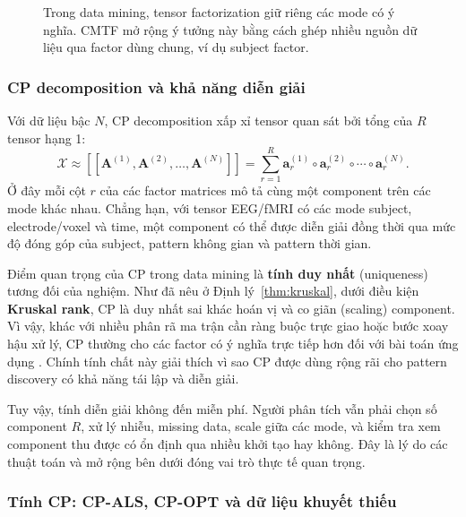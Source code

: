 \begin{figure}[H]
{
}
\caption{Trong data mining, tensor factorization giữ riêng các mode có ý nghĩa. CMTF mở rộng ý tưởng này bằng cách ghép nhiều nguồn dữ liệu qua factor dùng chung, ví dụ subject factor.}
\label{fig:dm-cmtf-interpretability}
\end{figure}

\subsubsection{CP decomposition và khả năng diễn giải}
\label{sec:dm-uniqueness}

Với dữ liệu bậc $N$, CP decomposition xấp xỉ tensor quan sát bởi tổng của $R$ tensor hạng 1:
\begin{equation}
    \mathcal{X}
    \approx
    [\![\mathbf{A}^{(1)}, \mathbf{A}^{(2)}, \ldots, \mathbf{A}^{(N)}]\!]
    =
    \sum_{r=1}^{R}
    \mathbf{a}^{(1)}_{r} \circ \mathbf{a}^{(2)}_{r} \circ \cdots \circ \mathbf{a}^{(N)}_{r}.
    \label{eq:dm-cp}
\end{equation}
Ở đây mỗi cột $r$ của các factor matrices mô tả cùng một component trên các mode khác nhau. Chẳng hạn, với tensor EEG/fMRI có các mode subject, electrode/voxel và time, một component có thể được diễn giải đồng thời qua mức độ đóng góp của subject, pattern không gian và pattern thời gian.

Điểm quan trọng của CP trong data mining là \textbf{tính duy nhất} (uniqueness) tương đối của nghiệm. Như đã nêu ở Định lý~\ref{thm:kruskal}, dưới điều kiện \textbf{Kruskal rank}, CP là duy nhất sai khác hoán vị và co giãn (scaling) component. Vì vậy, khác với nhiều phân rã ma trận cần ràng buộc trực giao hoặc bước xoay hậu xử lý, CP thường cho các factor có ý nghĩa trực tiếp hơn đối với bài toán ứng dụng \cite{kruskal1977three,sidiropoulos2017tensor,chrysos2025foundationsTutorial}. Chính tính chất này giải thích vì sao CP được dùng rộng rãi cho pattern discovery có khả năng tái lập và diễn giải.

Tuy vậy, tính diễn giải không đến miễn phí. Người phân tích vẫn phải chọn số component $R$, xử lý nhiễu, missing data, scale giữa các mode, và kiểm tra xem component thu được có ổn định qua nhiều khởi tạo hay không. Đây là lý do các thuật toán và mở rộng bên dưới đóng vai trò thực tế quan trọng.

\subsubsection{Tính CP: CP-ALS, CP-OPT và dữ liệu khuyết thiếu}
\label{sec:dm-algorithms}

